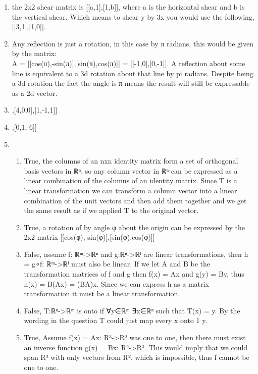 \documentclass[11pt]{article}
\begin{document}
\begin{enumerate}
\begin{enumerate}
\item the 2x2 shear matrix is [[a,1],[1,b]], where a is the horizontal
shear and b is the vertical shear. Which means to shear y by 3x
you would use the following, [[3,1],[1,0]].
\item Any reflection is just a rotation, in this case by π radians, this would
be given by the matrix:\\
A = [[cos(π),-sin(π)],[sin(π),cos(π)]] = [[-1,0],[0,-1]].
A reflection about some line is equivalent to a 3d rotation about that
line by pi radians. Despite being a 3d rotation the fact the angle is π
means the result will still be expressable as a 2d vector.
\item\relax [[3,0,-2],[4,0,0],[1,-1,1]]
\item\relax [[1,-5,4],[0,1,-6]]
\item \begin{enumerate}
\item True, the columns of an nxn identity matrix form a set of orthogonal
basis vectors in ℝⁿ, so any column vector in ℝⁿ can be expressed as a
linear combination of the columns of an identity matrix. Since T is a
linear transformation we can transform a column vector into a linear
combination of the unit vectors and then add them together and we get
the same result as if we applied T to the original vector.
\item True, a rotation of by angle φ about the origin can be expressed by
the 2x2 matrix [[cos(φ),-sin(φ)],[sin(φ),cos(φ)]]
\item False, assume f: ℝᵐ->ℝⁿ and g:ℝⁿ->ℝˡ are linear transformations, then
h = g∘f: ℝᵐ->ℝˡ must also be linear. If we let A and B be the
transformation matrices of f and g then f(x) = Ax and g(y) = By, thus
h(x) = B(Ax) = (BA)x. Since we can express h as a matrix
transformation it must be a linear transformation.
\item False, T:ℝⁿ->ℝᵐ is onto if ∀y∈ℝᵐ ∃x∈ℝⁿ such that T(x) = y. By the
wording in the question T could just map every x onto 1 y.
\item True, Assume f(x) = Ax: R³->R² was one to one, then there must exist
an inverse function g(x) = Bx: R²->R³. This would imply that we could
span R³ with only vectors from R², which is impossible, thus f cannot
be one to one.
\end{enumerate}
\end{enumerate}
\end{enumerate}
\end{document}
